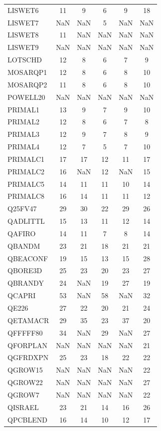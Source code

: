 \begin{longtable}{lccccc}
LISWET6 & 11 & 9 & 6 & 9 & 18 \\
LISWET7 & NaN & NaN & 5 & NaN & NaN \\
LISWET8 & 11 & NaN & NaN & NaN & NaN \\
LISWET9 & NaN & NaN & NaN & NaN & NaN \\
LOTSCHD & 12 & 8 & 6 & 7 & 9 \\
MOSARQP1 & 12 & 8 & 6 & 8 & 10 \\
MOSARQP2 & 11 & 8 & 6 & 8 & 10 \\
POWELL20 & NaN & NaN & NaN & NaN & NaN \\
PRIMAL1 & 13 & 9 & 7 & 9 & 10 \\
PRIMAL2 & 12 & 8 & 6 & 7 & 8 \\
PRIMAL3 & 12 & 9 & 7 & 8 & 9 \\
PRIMAL4 & 12 & 7 & 5 & 7 & 10 \\
PRIMALC1 & 17 & 17 & 12 & 11 & 17 \\
PRIMALC2 & 16 & NaN & 12 & NaN & 15 \\
PRIMALC5 & 14 & 11 & 11 & 10 & 14 \\
PRIMALC8 & 16 & 14 & 11 & 11 & 12 \\
Q25FV47 & 29 & 30 & 22 & 29 & 26 \\
QADLITTL & 15 & 13 & 11 & 12 & 14 \\
QAFIRO & 14 & 11 & 7 & 8 & 14 \\
QBANDM & 23 & 21 & 18 & 21 & 21 \\
QBEACONF & 19 & 15 & 13 & 15 & 28 \\
QBORE3D & 25 & 23 & 20 & 23 & 27 \\
QBRANDY & 24 & NaN & 19 & 27 & 19 \\
QCAPRI & 53 & NaN & 58 & NaN & 32 \\
QE226 & 27 & 22 & 20 & 21 & 24 \\
QETAMACR & 29 & 35 & 23 & 37 & 20 \\
QFFFFF80 & 34 & NaN & 29 & NaN & 27 \\
QFORPLAN & NaN & NaN & NaN & NaN & 21 \\
QGFRDXPN & 25 & 23 & 18 & 22 & 22 \\
QGROW15 & NaN & NaN & NaN & NaN & 22 \\
QGROW22 & NaN & NaN & NaN & NaN & 27 \\
QGROW7 & NaN & NaN & NaN & NaN & 22 \\
QISRAEL & 23 & 21 & 14 & 16 & 26 \\
QPCBLEND & 16 & 14 & 10 & 12 & 17 \\

\end{longtable}

